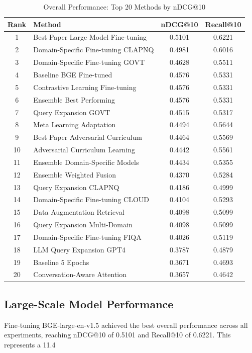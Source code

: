 \documentclass[11pt]{article}
\begin{document}
\begin{table}[htbp]
\centering
\caption{Overall Performance: Top 20 Methods by nDCG@10}
\label{tab:top20}
\footnotesize
\setlength{\tabcolsep}{3pt}
\begin{tabular}{clcc}
\toprule
\textbf{Rank} & \textbf{Method} & \textbf{nDCG@10} & \textbf{Recall@10} \\
\midrule
1 & Best Paper Large Model Fine-tuning & 0.5101 & 0.6221 \\
2 & Domain-Specific Fine-tuning CLAPNQ & 0.4981 & 0.6016 \\
3 & Domain-Specific Fine-tuning GOVT & 0.4628 & 0.5511 \\
4 & Baseline BGE Fine-tuned & 0.4576 & 0.5331 \\
5 & Contrastive Learning Fine-tuning & 0.4576 & 0.5331 \\
6 & Ensemble Best Performing & 0.4576 & 0.5331 \\
7 & Query Expansion GOVT & 0.4515 & 0.5317 \\
8 & Meta Learning Adaptation & 0.4494 & 0.5644 \\
9 & Best Paper Adversarial Curriculum & 0.4464 & 0.5569 \\
10 & Adversarial Curriculum Learning & 0.4442 & 0.5561 \\
11 & Ensemble Domain-Specific Models & 0.4434 & 0.5355 \\
12 & Ensemble Weighted Fusion & 0.4370 & 0.5284 \\
13 & Query Expansion CLAPNQ & 0.4186 & 0.4999 \\
14 & Domain-Specific Fine-tuning CLOUD & 0.4104 & 0.5293 \\
15 & Data Augmentation Retrieval & 0.4098 & 0.5099 \\
16 & Query Expansion Multi-Domain & 0.4098 & 0.5099 \\
17 & Domain-Specific Fine-tuning FIQA & 0.4026 & 0.5119 \\
18 & LLM Query Expansion GPT4 & 0.3787 & 0.4879 \\
19 & Baseline 5 Epochs & 0.3671 & 0.4693 \\
20 & Conversation-Aware Attention & 0.3657 & 0.4642 \\
\bottomrule
\end{tabular}
\end{table}

\subsection{Large-Scale Model Performance}
Fine-tuning BGE-large-en-v1.5 achieved the best overall performance across all experiments, reaching nDCG@10 of 0.5101 and Recall@10 of 0.6221. This represents a 11.4%
\end{document}
